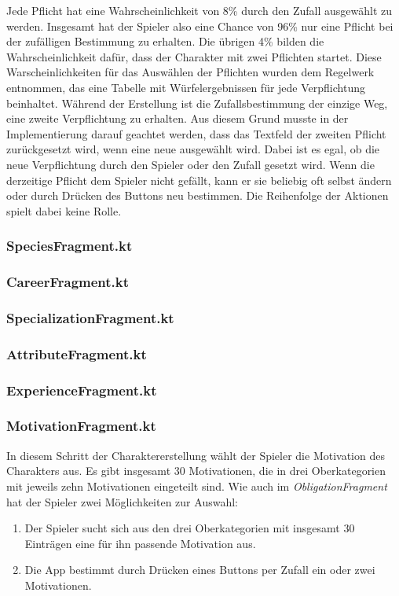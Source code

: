 Jede Pflicht hat eine Wahrscheinlichkeit von 8\% durch den Zufall ausgewählt zu werden. Insgesamt hat der Spieler also eine Chance von 96\% nur eine Pflicht bei der zufälligen Bestimmung zu erhalten. Die übrigen 4\% bilden die Wahrscheinlichkeit dafür, dass der Charakter mit zwei Pflichten startet. Diese Warscheinlichkeiten für das Auswählen der Pflichten wurden dem Regelwerk \cite[39]{rulebook} entnommen, das eine Tabelle mit Würfelergebnissen für jede Verpflichtung beinhaltet. Während der Erstellung ist die Zufallsbestimmung der einzige Weg, eine zweite Verpflichtung zu erhalten. Aus diesem Grund musste in der Implementierung darauf geachtet werden, dass das Textfeld der zweiten Pflicht zurückgesetzt wird, wenn eine neue ausgewählt wird. Dabei ist es egal, ob die neue Verpflichtung durch den Spieler oder den Zufall gesetzt wird. Wenn die derzeitige Pflicht dem Spieler nicht gefällt, kann er sie beliebig oft selbst ändern oder durch Drücken des Buttons neu bestimmen. Die Reihenfolge der Aktionen spielt dabei keine Rolle.\\

\subsubsection{SpeciesFragment.kt}
\subsubsection{CareerFragment.kt}
\subsubsection{SpecializationFragment.kt}
\subsubsection{AttributeFragment.kt}
\subsubsection{ExperienceFragment.kt}

\subsubsection{MotivationFragment.kt}
In diesem Schritt der Charaktererstellung wählt der Spieler die Motivation des Charakters aus. Es gibt insgesamt 30 Motivationen, die in drei Oberkategorien mit jeweils zehn Motivationen eingeteilt sind. Wie auch im \textit{ObligationFragment} hat der Spieler zwei Möglichkeiten zur Auswahl:
\begin{enumerate}
\item Der Spieler sucht sich aus den drei Oberkategorien mit insgesamt 30 Einträgen eine für ihn passende Motivation aus.
\item Die App bestimmt durch Drücken eines Buttons per Zufall ein oder zwei Motivationen.
\end{enumerate}

